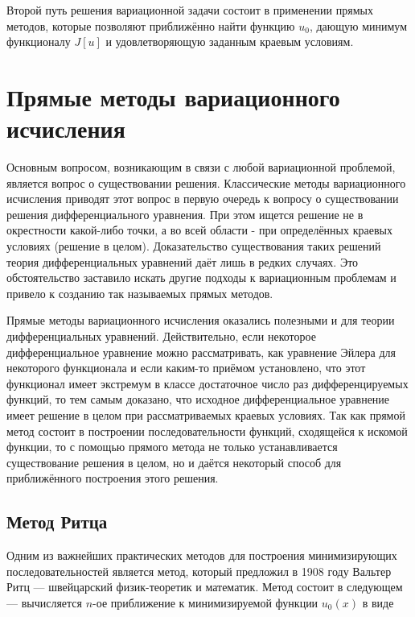 \documentclass{article}
\begin{document}
Второй путь решения вариационной задачи состоит в применении прямых методов, которые позволяют приближённо найти функцию $u_{0}$, дающую минимум функционалу $J[u]$ и удовлетворяющую заданным краевым условиям.


\newpage

\section{Прямые методы вариационного исчисления}

Основным вопросом, возникающим в связи с любой вариационной проблемой, является вопрос о существовании решения. Классические методы вариационного исчисления приводят этот вопрос в первую очередь к вопросу о существовании решения дифференциального уравнения. При этом ищется решение не в окрестности какой-либо точки, а во всей области - при определённых краевых условиях (решение в целом). Доказательство существования таких решений теория дифференциальных уравнений даёт лишь в редких случаях. Это обстоятельство заставило искать другие подходы к вариационным проблемам и привело к созданию так называемых прямых методов.

Прямые методы вариационного исчисления оказались полезными и для теории дифференциальных уравнений. Действительно, если некоторое дифференциальное уравнение можно рассматривать, как уравнение Эйлера для некоторого функционала и если каким-то приёмом установлено, что этот функционал имеет экстремум в классе достаточное число раз дифференцируемых функций, то тем самым доказано, что исходное дифференциальное уравнение имеет решение в целом при рассматриваемых краевых условиях. Так как прямой метод состоит в построении последовательности функций, сходящейся к искомой функции, то с помощью прямого метода не только устанавливается существование решения в целом, но и даётся некоторый способ для приближённого построения этого решения.


\subsection{Метод Ритца}

Одним из важнейших практических методов для построения минимизирующих последовательностей является метод, который предложил в 1908 году Вальтер Ритц --- швейцарский физик-теоретик и математик. Метод состоит в следующем --- вычисляется $n$-ое приближение к минимизируемой функции $u_{0}(x)$ в виде
\end{document}
